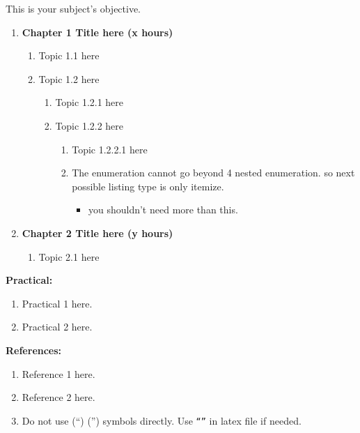 
\cobjectives
  This is your subject's objective.
  \VS

\begin{enumerate}
  \item \textbf{Chapter 1 Title here \hfill (x hours)}
    \begin{enumerate}
      \item Topic 1.1 here
      \item Topic 1.2 here
        \begin{enumerate}
          \item Topic 1.2.1 here
          \item Topic 1.2.2 here
            \begin{enumerate}
              \item Topic 1.2.2.1 here
              \item The enumeration cannot go beyond 4 nested enumeration. so next possible listing type is only itemize.
                \begin{itemize}
                  \item you shouldn't need more than this.
                \end{itemize}
            \end{enumerate}
        \end{enumerate}
    \end{enumerate}
    \vs

  \item \textbf{Chapter 2 Title here \hfill (y hours)}
    \begin{enumerate}
      \item Topic 2.1 here
    \end{enumerate}
    \vs
\end{enumerate}
\Vs

\noindent \textbf{Practical:}
  \begin{enumerate}[label=\arabic*.]
    \item Practical 1 here.
    \item Practical 2 here.
  \end{enumerate}
\Vs

\noindent \textbf{References:}
  \begin{enumerate}[label=\arabic*.]
    \item Reference 1 here.
    \item Reference 2 here.
    \item Do not use (``) ('') symbols directly. Use \texttt{``''} in latex file if needed.
    
  \end{enumerate}

\newpage

